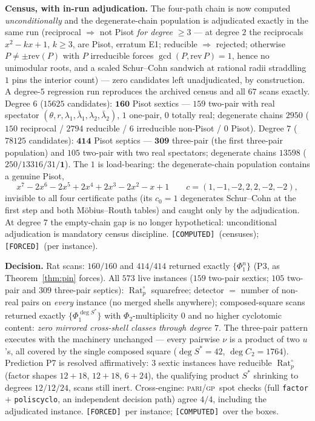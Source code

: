 \documentclass[11pt]{article}
\newcommand{\F}{\textnormal{\texttt{[FORCED]}}}
\newcommand{\C}{\textnormal{\texttt{[COMPUTED]}}}
\newcommand{\Rat}{\operatorname{Rat}}
\newcommand{\gp}{\textsc{pari/gp}}
\theoremstyle{definition}
\begin{document}
\textbf{Census, with in-run adjudication.} The four-path chain is now
computed \emph{unconditionally} and the degenerate-chain population is
adjudicated exactly in the same run (reciprocal $\Rightarrow$ not Pisot
\emph{for degree $\ge3$} --- at degree $2$ the reciprocals $x^2-kx+1$,
$k\ge3$, are Pisot, erratum E1; reducible $\Rightarrow$ rejected;
otherwise $P\neq\pm\mathrm{rev}(P)$ with
$P$ irreducible forces $\gcd(P,\mathrm{rev}\,P)=1$, hence no unimodular
roots, and a scaled Schur--Cohn sandwich at rational radii straddling $1$
pins the interior count) --- zero candidates left unadjudicated, by
construction. A degree-$5$ regression run reproduces the archived census
and all $67$ scans exactly. Degree $6$ ($15625$ candidates): $\mathbf{160}$
Pisot sextics --- $159$ two-pair with real spectator
$(\theta,r,\lambda_1,\bar\lambda_1,\lambda_2,\bar\lambda_2)$, $1$ one-pair,
$0$ totally real; degenerate chains $2950$ ($150$ reciprocal / $2794$
reducible / $6$ irreducible non-Pisot / $0$ Pisot). Degree $7$ ($78125$
candidates): $\mathbf{414}$ Pisot septics --- $\mathbf{309}$ three-pair
(the first three-pair population) and $105$ two-pair with two real
spectators; degenerate chains $13598$ ($250/13316/31/\mathbf{1}$). The
$1$ is load-bearing: the degenerate-chain population contains a genuine
Pisot,
\[
x^7-2x^6-2x^5+2x^4+2x^3-2x^2-x+1\qquad c=(1,-1,-2,2,2,-2,-2),
\]
invisible to all four certificate paths (its $c_0=1$ degenerates
Schur--Cohn at the first step and both M\"obius--Routh tables) and caught
only by the adjudication. At degree $7$ the empty-chain gap is no longer
hypothetical: unconditional adjudication is mandatory census discipline.
\C\ (censuses); \F\ (per instance).

\textbf{Decision.} Rat scans: $160/160$ and $414/414$ returned exactly
$\{\Phi_1^{n}\}$ (P3, as Theorem~\ref{thm:pin} forces). All $573$ live
instances ($159$ two-pair sextics; $105$ two-pair and $309$ three-pair
septics): $\Rat_p^{\circ}$ squarefree; detector $=$ number of non-real
pairs on \emph{every} instance (no merged shells anywhere); composed-square
scans returned exactly $\{\Phi_1^{\deg S^{*}}\}$ with $\Phi_2$-multiplicity
$0$ and no higher cyclotomic content: \emph{zero mirrored cross-shell
classes through degree $7$}. The three-pair pattern executes with the
machinery unchanged --- every pairwise $\nu$ is a product of two $u$'s,
all covered by the single composed square ($\deg S^{*}=42$,
$\deg C_2=1764$). Prediction P7 is resolved affirmatively: $3$ sextic
instances have reducible $\Rat_p^{\circ}$ (factor shapes $12{+}18$,
$12{+}18$, $6{+}24$), the qualifying product $S^{*}$ shrinking to degrees
$12/12/24$, scans still inert. Cross-engine: \gp\ spot checks (full
\texttt{factor} $+$ \texttt{poliscyclo}, an independent decision path)
agree $4/4$, including the adjudicated instance. \F\ per instance; \C\
over the boxes.
\end{document}
